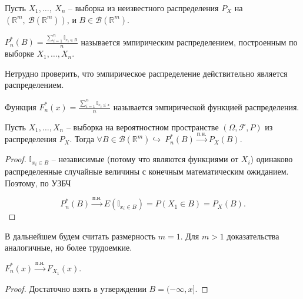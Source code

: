 Пусть $\displaystyle X_{1} ,\dotsc,\ X_{n}$ -- выборка из неизвестного распределения $\displaystyle P_{X}$ на $\displaystyle \left(\mathbb{R}^{m},\ \mathcal{B}\left(\mathbb{R}^{m}\right)\right)$, и $\displaystyle B\in \mathcal{B}\left(\mathbb{R}^{m}\right)$.
\begin{definition}
	$\displaystyle P_{n}^{*}( B) =\frac{\sum _{i=1}^{n}\mathbb{I}_{x_{i} \in B}}{n}$ называется эмпирическим распределением, построенным по выборке $\displaystyle X_{1} ,\dotsc ,X_{n}$.
\end{definition}

Нетрудно проверить, что эмпирическое распределение действительно является распределением.

\begin{definition}
	Функция $\displaystyle F_{n}^{*}( x) =\frac{\sum _{i=1}^{n}\mathbb{I}_{x_{i} \leqslant x}}{n}$ называется эмпирической функцией распределения.
\end{definition}

\begin{proposition}
	Пусть $\displaystyle X_{1} ,\dotsc ,X_{n}$ -- выборка на вероятностном пространстве $\displaystyle ( \Omega ,\mathcal{F} ,P)$ из распределения $\displaystyle P_{X}$. Тогда $\displaystyle \forall B\in \mathcal{B}\left(\mathbb{R}^{m}\right) \hookrightarrow \ P_{n}^{*}( B)\xrightarrow{\text{п.н.}} P_{X}( B)$.
\end{proposition}
\begin{proof}
    $\displaystyle \mathbb{I}_{x_{i} \in B}$ -- независимые (потому что являются функциями от $\displaystyle X_{i}$) одинаково распределенные случайные величины с конечным математическим ожиданием. Поэтому, по УЗБЧ
    
    \begin{equation*}
    	P_{n}^{*}( B)\xrightarrow{\text{п.н.}} E (\mathbb{I}_{x_{i} \in B}) =P( X_{1} \in B) =P_{X}( B).
    \end{equation*}
\end{proof}

В дальнейшем будем считать размерность $\displaystyle m=1$. Для $\displaystyle m >1$ доказательства аналогичные, но более трудоемкие.

\begin{corollary}
	$\displaystyle F_{n}^{*}( x)\xrightarrow{\text{п.н.}} F_{X_{1}}( x)$. 
\end{corollary}
\begin{proof}
Достаточно взять в утверждении $\displaystyle B=( -\infty ,x]$.
\end{proof}

